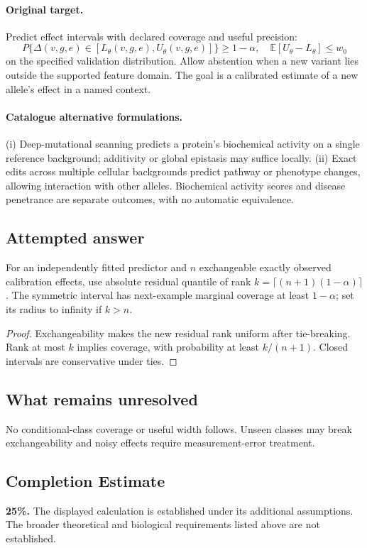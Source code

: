 \documentclass[11pt]{article}
\begin{document}
\paragraph{Original target.}
Predict effect intervals with declared coverage and useful precision:
\[
P\{\Delta(v,g,e)\in[L_\theta(v,g,e),U_\theta(v,g,e)]\}\geq1-\alpha,
\quad \mathbb{E}[U_\theta-L_\theta]\leq w_0
\]
on the specified validation distribution. Allow abstention when a new variant lies outside the supported feature domain. The goal is a calibrated estimate of a new allele's effect in a named context.
\paragraph{Catalogue alternative formulations.}
(i) Deep-mutational scanning predicts a protein's biochemical activity on a single reference background; additivity or global epistasis may suffice locally. (ii) Exact edits across multiple cellular backgrounds predict pathway or phenotype changes, allowing interaction with other alleles. Biochemical activity scores and disease penetrance are separate outcomes, with no automatic equivalence.
\subsection{Attempted answer}
\begin{proposition}
For an independently fitted predictor and $n$ exchangeable exactly observed calibration effects, use absolute residual quantile of rank $k=\lceil(n+1)(1-\alpha)\rceil$. The symmetric interval has next-example marginal coverage at least $1-\alpha$; set its radius to infinity if $k>n$.
\end{proposition}
\begin{proof}
Exchangeability makes the new residual rank uniform after tie-breaking. Rank at most $k$ implies coverage, with probability at least $k/(n+1)$. Closed intervals are conservative under ties.
\end{proof}
\subsection{What remains unresolved}
No conditional-class coverage or useful width follows. Unseen classes may break exchangeability and noisy effects require measurement-error treatment.
\subsection{Completion Estimate}
\textbf{25\%.} The displayed calculation is established under its additional assumptions. The broader theoretical and biological requirements listed above are not established.
\end{document}
